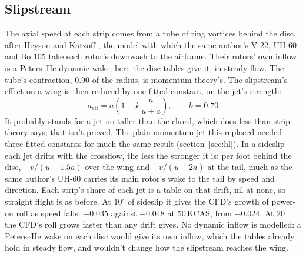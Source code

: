 \documentclass[10pt,a4paper,twocolumn]{article}
\begin{document}
\subsection{Slipstream}\label{sec:wake}
The axial speed at each strip comes from a tube of ring vortices behind the disc, after Heyson and Katzoff \cite{hk}, the model with which the same author's V-22, UH-60 and Bo 105 take each rotor's downwash to the airframe. Their rotors' own inflow is a Peters--He dynamic wake; here the disc tables give it, in steady flow. The tube's contraction, 0.90 of the radius, is momentum theory's. The
slipstream's effect on a wing is then reduced by one fitted constant, on the jet's strength:
\begin{equation}
a_\text{eff} = a\left(1 - k\,\frac{a}{u+a}\right),\qquad k = 0.70
\end{equation}
It probably stands for a jet no taller than the chord, which does less than strip theory says; that isn't proved. The plain momentum jet this replaced needed three fitted constants for much the same result (section~\ref{sec:hl}). In a sideslip each jet drifts with the crossflow, the less the stronger it is: per foot behind the disc, $-v/(u+1.5a)$ over the wing and $-v/(u+2a)$ at the tail, much as the same author's UH-60 carries its main rotor's wake to the tail by speed and direction. Each strip's share of each jet is a table on that drift, nil at none, so straight flight is as before. At 10$^\circ$ of sideslip it gives the CFD's growth of power-on roll as speed falls: $-0.035$ against $-0.048$ at 50\,KCAS, from $-0.024$. At 20$^\circ$ the CFD's roll grows faster than any drift gives. No dynamic inflow is
modelled: a Peters--He wake on each disc would give its own inflow, which the tables already hold in steady flow, and wouldn't change how the slipstream reaches the wing.
\end{document}
